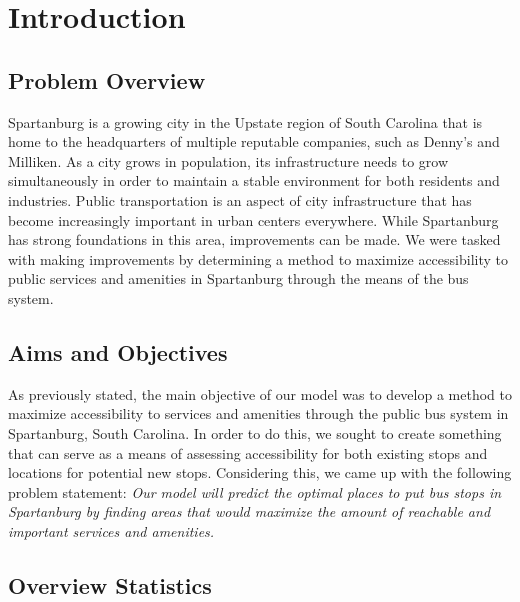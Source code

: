 \section{Introduction}

\subsection{Problem Overview}

Spartanburg is a growing city in the Upstate region of South Carolina that is home to the headquarters of multiple reputable companies, such as Denny's and Milliken. As a city grows in population, its infrastructure needs to grow simultaneously in order to maintain a stable environment for both residents and industries. Public transportation is an aspect of city infrastructure that has become increasingly important in urban centers everywhere.  While Spartanburg has strong foundations in this area, improvements can be made. We were tasked with making improvements by determining a method to maximize accessibility to public services and amenities in Spartanburg through the means of the bus system. 

\subsection{Aims and Objectives}

As previously stated, the main objective of our model was to develop a method to maximize accessibility to services and amenities through the public bus system in Spartanburg, South Carolina. In order to do this, we sought to create something that can serve as a means of assessing accessibility for both existing stops and locations for potential new stops. Considering this, we came up with the following problem statement:
\linebreak
\linebreak
    \textit{Our model will predict the optimal places to put bus stops in Spartanburg by finding areas that would maximize the amount of reachable and important services and amenities.}

\subsection{Overview Statistics}


